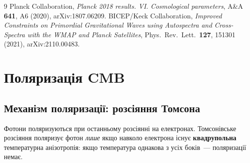 \documentclass[12pt, a4paper]{article}
\begin{document}
\begin{thebibliography}{9}
  Planck Collaboration,
  \textit{Planck 2018 results. VI. Cosmological parameters},
  A\&A \textbf{641}, A6 (2020),
  arXiv:1807.06209.
  BICEP/Keck Collaboration,
  \textit{Improved Constraints on Primordial Gravitational Waves using
  Autospectra and Cross-Spectra with the WMAP and Planck Satellites},
  Phys.\ Rev.\ Lett.\ \textbf{127}, 151301 (2021),
  arXiv:2110.00483.
\end{thebibliography}

%
%

\section{Поляризація CMB}

\subsection*{Механізм поляризації: розсіяння Томсона}

Фотони поляризуються при останньому розсіянні на електронах.
Томсонівське розсіяння поляризує фотон \emph{лише} якщо навколо електрона
існує \textbf{квадрупольна} температурна анізотропія: якщо температура
однакова з усіх боків~--- поляризації немає.
\end{document}
